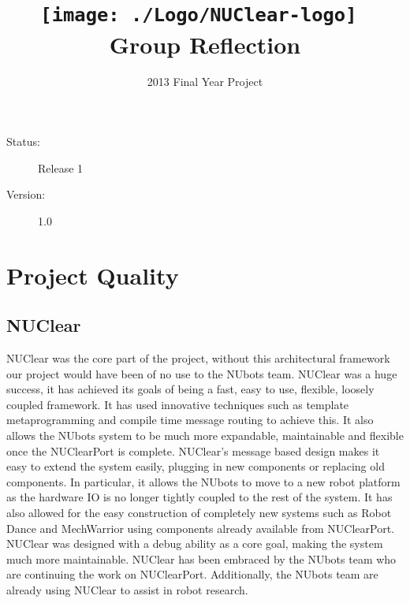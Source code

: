 \documentclass[english,12pt]{scrartcl}
\title{\texttt{[image: ./Logo/NUClear-logo]}~\\[1cm] Group Reflection}
\author{2013 Final Year Project}
\begin{document}
	\maketitle
	\vfill
	{\large
		\begin{description}
			\item [Status:] Release 1
			\item [Version:] 1.0
		\end{description}}

	\clearpage
	\tableofcontents

	\clearpage

\section{Project Quality}
	\subsection{NUClear}
		NUClear was the core part of the project, without this architectural framework our project would have been of no use to the NUbots team.
		NUClear was a huge success, it has achieved its goals of being a fast, easy to use, flexible, loosely coupled framework.
		It has used innovative techniques such as template metaprogramming and compile time message routing to achieve this.
		It also allows the NUbots system to be much more expandable, maintainable and flexible once the NUClearPort is complete.
		NUClear’s message based design makes it easy to extend the system easily, plugging in new components or replacing old components.
		In particular, it allows the NUbots to move to a new robot platform as the hardware IO is no longer tightly coupled to the rest of the system.
		It has also allowed for the easy construction of completely new systems such as Robot Dance and MechWarrior using components already available from NUClearPort.
		NUClear was designed with a debug ability as a core goal, making the system much more maintainable. NUClear has been embraced by the NUbots team who are continuing the work on NUClearPort.
		Additionally, the NUbots team are already using NUClear to assist in robot research.
\end{document}
